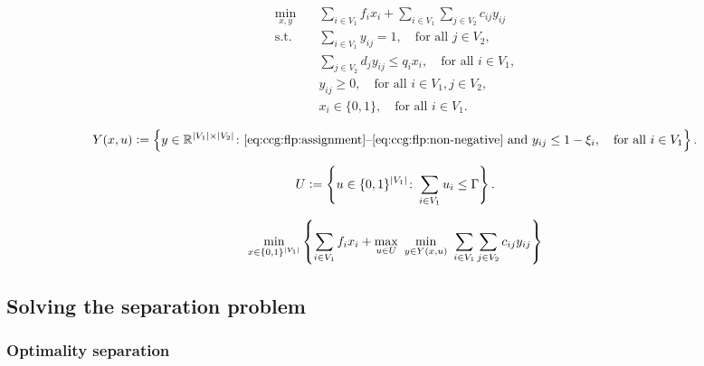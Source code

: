 \begin{subequations}
    \begin{align}
        \min_{x,y} \quad & \sum_{i\in V_1} f_ix_i + \sum_{i\in V_1} \sum_{j\in V_2} c_{ij} y_{ij} \\
        \text{s.t.} \quad & \sum_{i\in V_1} y_{ij} = 1, \quad \text{for all } j\in V_2, \label{eq:ccg:flp:assignment} \\
        & \sum_{j\in V_2} d_jy_{ij} \le q_ix_i, \quad \text{for all } i\in V_1, \label{eq:ccg:flp:capacity} \\
        & y_{ij} \ge 0, \quad \text{for all } i\in V_1, j\in V_2, \label{eq:ccg:flp:non-negative} \\
        & x_i\in\{0,1\}, \quad \text{for all } i\in V_1.
    \end{align}
\end{subequations}

$$Y(x,u) \mathrel{{\mathop:}{=}} \left\{ y\in\mathbb{R}^{|V_1|\times|V_2|} \colon
\text{\eqref{eq:ccg:flp:assignment}--\eqref{eq:ccg:flp:non-negative} and }
y_{ij} \le 1 - \xi_i, \quad \text{for all }i\in V_1 \right\}.$$

$$U \mathrel{{\mathop:}{=}} \left\{ u\in\{0,1\}^{|V_1|} \colon \sum_{i\in V_1} u_i \le \Gamma \right\}.$$

\begin{equation*}
    \min_{x\in\{0,1\}^{|V_1|}} \Set{
        \sum_{i\in V_1} f_ix_i +
        \max_{u\in U} \ 
        \min_{ y\in Y(x,u) } \ 
        \sum_{i\in V_1} \sum_{j\in V_2} c_{ij} y_{ij}
    }
\end{equation*}

\subsection{Solving the separation problem}

\subsubsection{Optimality separation}

